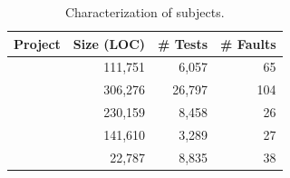 \documentclass{article}
\begin{document}
\begin{table}[tb]
  \small
  \centering
  \setlength{\tabcolsep}{4pt}
  \begin{tabular}{lrrr}
    \toprule
    Project            & Size (LOC) & \# Tests & \# Faults \\ %
    \midrule
    \lang{}            & 111,751  & 6,057 & 65       \\   %
    \cmath{}           & 306,276  & 26,797 & 104     \\   %
    \chart{}           & 230,159  & 8,458 & 26      \\  %
    \jtime{}           & 141,610  & 3,289 & 27       \\   %
    \mockito{}         & 22,787  & 8,835 & 38    \\     %
    \bottomrule
  \end{tabular}
  \caption {Characterization of \dfj{} subjects.}
  \label{tab:df4j}
\end{table}
\normalsize




\end{document}
